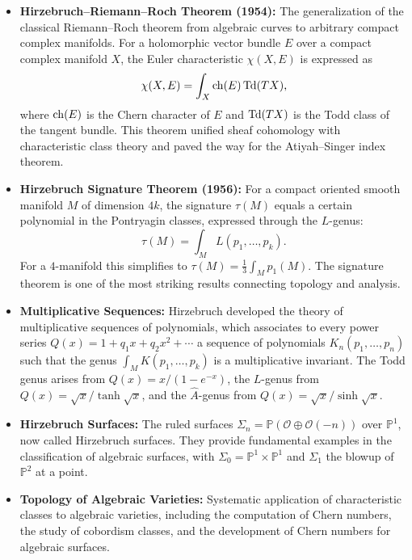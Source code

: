 \begin{itemize}
    \item \textbf{Hirzebruch--Riemann--Roch Theorem (1954):}
    The generalization of the classical Riemann--Roch theorem from
    algebraic curves to arbitrary compact complex manifolds. For a
    holomorphic vector bundle \(E\) over a compact complex manifold
    \(X\), the Euler characteristic \(\chi(X, E)\) is expressed as
    \[
    \chi(X, E) = \int_X \operatorname{ch}(E) \operatorname{Td}(TX),
    \]
    where \(\operatorname{ch}(E)\) is the Chern character of \(E\) and \(\operatorname{Td}(TX)\) is
    the Todd class of the tangent bundle. This theorem unified sheaf
    cohomology with characteristic class theory and paved the way for
    the Atiyah--Singer index theorem.

    \item \textbf{Hirzebruch Signature Theorem (1956):}
    For a compact oriented smooth manifold \(M\) of dimension \(4k\),
    the signature \(\tau(M)\) equals a certain polynomial in the
    Pontryagin classes, expressed through the \(L\)-genus:
    \[
    \tau(M) = \int_M L(p_1, \dots, p_k).
    \]
    For a \(4\)-manifold this simplifies to
    \(\tau(M) = \frac13 \int_M p_1(M)\). The signature theorem is one
    of the most striking results connecting topology and analysis.

    \item \textbf{Multiplicative Sequences:}
    Hirzebruch developed the theory of multiplicative sequences of
    polynomials, which associates to every power series
    \(Q(x) = 1 + q_1 x + q_2 x^2 + \cdots\) a sequence of polynomials
    \(K_n(p_1, \dots, p_n)\) such that the genus
    \(\int_M K(p_1, \dots, p_k)\) is a multiplicative invariant. The
    Todd genus arises from \(Q(x) = x/(1 - e^{-x})\), the \(L\)-genus
    from \(Q(x) = \sqrt{x}/\tanh\sqrt{x}\), and the \(\hat{A}\)-genus
    from \(Q(x) = \sqrt{x}/ \sinh\sqrt{x}\).

    \item \textbf{Hirzebruch Surfaces:}
    The ruled surfaces \(\Sigma_n = \mathbb{P}(\mathcal{O} \oplus
    \mathcal{O}(-n))\) over \(\mathbb{P}^1\), now called Hirzebruch
    surfaces. They provide fundamental examples in the classification
    of algebraic surfaces, with \(\Sigma_0 = \mathbb{P}^1 \times
    \mathbb{P}^1\) and \(\Sigma_1\) the blowup of \(\mathbb{P}^2\) at a
    point.

    \item \textbf{Topology of Algebraic Varieties:}
    Systematic application of characteristic classes to algebraic
    varieties, including the computation of Chern numbers, the study
    of cobordism classes, and the development of Chern numbers for
    algebraic surfaces.


\end{itemize}
